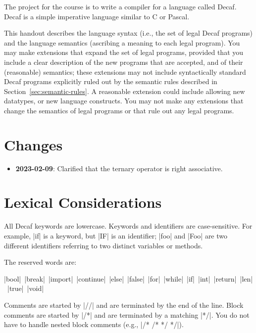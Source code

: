 \documentclass[11pt]{article}
\begin{document}


The project for the course is to write a compiler for a language called Decaf.
Decaf is a simple imperative language similar to C or Pascal.

This handout describes the language syntax (i.e., the set of legal Decaf programs) and the language semantics (ascribing a meaning to each legal program).
You may make extensions that expand the set of legal programs, provided that you include a clear description of the new programs that are accepted, and of their (reasonable) semantics; these extensions may not include syntactically standard Decaf programs explicitly ruled out by the semantic rules described in Section~\ref{sec:semantic-rules}.
A reasonable extension could include allowing new datatypes, or new language constructs.
You may not make any extensions that change the semantics of legal programs or that rule out any legal programs.

\section{Changes}

\begin{itemize}
\item \textbf{2023-02-09}: Clarified that the ternary operator is right associative.
\end{itemize}

\section{Lexical Considerations}

All Decaf keywords are lowercase.
Keywords and identifiers are case-sensitive.
For example, \decaf|if| is a keyword, but \decaf|IF| is an identifier; \decaf|foo| and \decaf|Foo| are two different identifiers referring to two distinct variables or methods.

The reserved words are:

\decaf|bool|~\decaf|break|~\decaf|import|~\decaf|continue|~\decaf|else|~\decaf|false|~\decaf|for|~\decaf|while|~\decaf|if|~\decaf|int|~\decaf|return|~\decaf|len|~\decaf|true|~\decaf|void|

Comments are started by \decaf|//| and are terminated by the end of the line.
Block comments are started by \decaf|/*| and are terminated by a matching \decaf[basicstyle=\ttfamily\color{decafGrey}]|*/|.
You do not have to handle nested block comments (e.g., \decaf[basicstyle=\ttfamily\color{decafGrey}]|/* /* */ */|).
\end{document}
